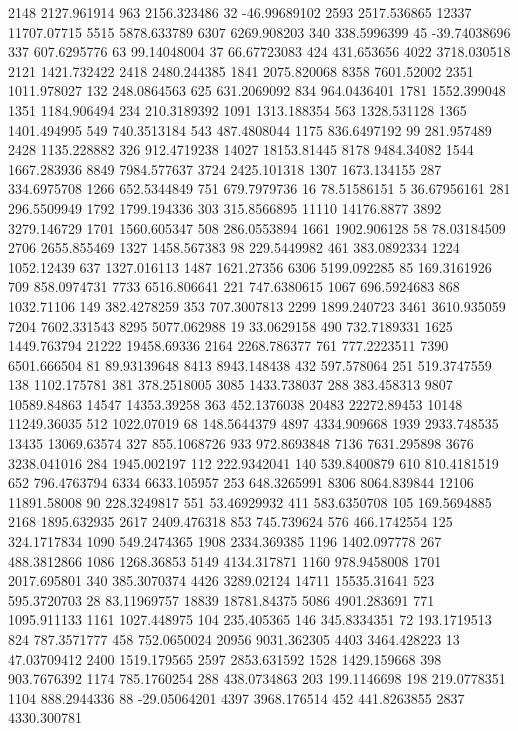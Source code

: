 2148	2127.961914
963	2156.323486
32	-46.99689102
2593	2517.536865
12337	11707.07715
5515	5878.633789
6307	6269.908203
340	338.5996399
45	-39.74038696
337	607.6295776
63	99.14048004
37	66.67723083
424	431.653656
4022	3718.030518
2121	1421.732422
2418	2480.244385
1841	2075.820068
8358	7601.52002
2351	1011.978027
132	248.0864563
625	631.2069092
834	964.0436401
1781	1552.399048
1351	1184.906494
234	210.3189392
1091	1313.188354
563	1328.531128
1365	1401.494995
549	740.3513184
543	487.4808044
1175	836.6497192
99	281.957489
2428	1135.228882
326	912.4719238
14027	18153.81445
8178	9484.34082
1544	1667.283936
8849	7984.577637
3724	2425.101318
1307	1673.134155
287	334.6975708
1266	652.5344849
751	679.7979736
16	78.51586151
5	36.67956161
281	296.5509949
1792	1799.194336
303	315.8566895
11110	14176.8877
3892	3279.146729
1701	1560.605347
508	286.0553894
1661	1902.906128
58	78.03184509
2706	2655.855469
1327	1458.567383
98	229.5449982
461	383.0892334
1224	1052.12439
637	1327.016113
1487	1621.27356
6306	5199.092285
85	169.3161926
709	858.0974731
7733	6516.806641
221	747.6380615
1067	696.5924683
868	1032.71106
149	382.4278259
353	707.3007813
2299	1899.240723
3461	3610.935059
7204	7602.331543
8295	5077.062988
19	33.0629158
490	732.7189331
1625	1449.763794
21222	19458.69336
2164	2268.786377
761	777.2223511
7390	6501.666504
81	89.93139648
8413	8943.148438
432	597.578064
251	519.3747559
138	1102.175781
381	378.2518005
3085	1433.738037
288	383.458313
9807	10589.84863
14547	14353.39258
363	452.1376038
20483	22272.89453
10148	11249.36035
512	1022.07019
68	148.5644379
4897	4334.909668
1939	2933.748535
13435	13069.63574
327	855.1068726
933	972.8693848
7136	7631.295898
3676	3238.041016
284	1945.002197
112	222.9342041
140	539.8400879
610	810.4181519
652	796.4763794
6334	6633.105957
253	648.3265991
8306	8064.839844
12106	11891.58008
90	228.3249817
551	53.46929932
411	583.6350708
105	169.5694885
2168	1895.632935
2617	2409.476318
853	745.739624
576	466.1742554
125	324.1717834
1090	549.2474365
1908	2334.369385
1196	1402.097778
267	488.3812866
1086	1268.36853
5149	4134.317871
1160	978.9458008
1701	2017.695801
340	385.3070374
4426	3289.02124
14711	15535.31641
523	595.3720703
28	83.11969757
18839	18781.84375
5086	4901.283691
771	1095.911133
1161	1027.448975
104	235.405365
146	345.8334351
72	193.1719513
824	787.3571777
458	752.0650024
20956	9031.362305
4403	3464.428223
13	47.03709412
2400	1519.179565
2597	2853.631592
1528	1429.159668
398	903.7676392
1174	785.1760254
288	438.0734863
203	199.1146698
198	219.0778351
1104	888.2944336
88	-29.05064201
4397	3968.176514
452	441.8263855
2837	4330.300781
